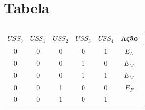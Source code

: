 \section{Tabela} %
\begin{table}[!htb]
\centering
\caption{}
\label{IA}
\begin{tabular}{|ccccc|c|}
\hline
{\color[HTML]{00009B} \textbf{$USS_0$}} & {\color[HTML]{00009B} \textbf{$USS_1$}} & {\color[HTML]{00009B} \textbf{$USS_2$}} & 
{\color[HTML]{00009B} \textbf{$USS_3$}} & {\color[HTML]{00009B} \textbf{$USS_4$}} & {\color[HTML]{FE0000} \textbf{Ação}} \\ 
\hline
{\color[HTML]{00009B} 0}                                     & {\color[HTML]{00009B} 0}                                    & {\color[HTML]{00009B} 0}  
                                  & {\color[HTML]{00009B} 0}                                    & {\color[HTML]{00009B} 1}                             
       & {\color[HTML]{FE0000} $E_L$}                                     \\ \hline
{\color[HTML]{00009B} 0}                                     & {\color[HTML]{00009B} 0}                                    & {\color[HTML]{00009B} 0}  
                                  & {\color[HTML]{00009B} 1}                                    & {\color[HTML]{00009B} 0}                             
       & {\color[HTML]{FE0000} $E_M$}                                     \\ \hline
{\color[HTML]{00009B} 0}                                     & {\color[HTML]{00009B} 0}                                    & {\color[HTML]{00009B} 0}  
                                  & {\color[HTML]{00009B} 1}                                    & {\color[HTML]{00009B} 1}                             
       & {\color[HTML]{FE0000} $E_M$}                                     \\ \hline
{\color[HTML]{00009B} 0}                                     & {\color[HTML]{00009B} 0}                                    & {\color[HTML]{00009B} 1}  
                                  & {\color[HTML]{00009B} 0}                                    & {\color[HTML]{00009B} 0}                             
       & {\color[HTML]{FE0000} $E_F$}                                     \\ \hline
{\color[HTML]{00009B} 0}                                     & {\color[HTML]{00009B} 0}                                    & {\color[HTML]{00009B} 1}  
                                  & {\color[HTML]{00009B} 0}                                    & {\color[HTML]{00009B} 1}                             

\end{tabular}
\end{table}
